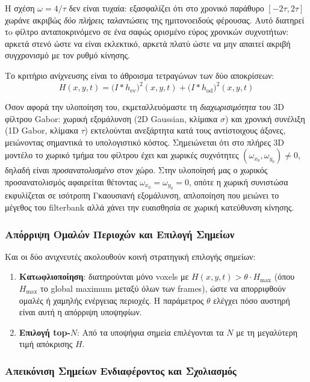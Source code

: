 \documentclass[12pt, a4paper]{article}
\begin{document}
Η σχέση $\omega = 4/\tau$ δεν είναι τυχαία: εξασφαλίζει ότι στο χρονικό παράθυρο
$[-2\tau, 2\tau]$ χωράνε ακριβώς \emph{δύο πλήρεις ταλαντώσεις} της ημιτονοειδούς
φέρουσας. Αυτό διατηρεί τo φίλτρο ανταποκρινόμενο σε ένα σαφώς ορισμένο εύρος
χρονικών συχνοτήτων: αρκετά στενό ώστε να είναι εκλεκτικό, αρκετά πλατύ ώστε
να μην απαιτεί ακριβή συγχρονισμό με τον ρυθμό κίνησης.

Το κριτήριο ανίχνευσης είναι το άθροισμα τετραγώνων των δύο αποκρίσεων:
\begin{equation}
    H(x,y,t) =
    \bigl(I \ast h_{\text{ev}}\bigr)^2(x,y,t) +
    \bigl(I \ast h_{\text{od}}\bigr)^2(x,y,t)
\end{equation}

Όσον αφορά την υλοποίηση του, εκμεταλλευόμαστε τη \emph{διαχωρισιμότητα} του 3D φίλτρου
Gabor: χωρική εξομάλυνση (2D Gaussian, κλίμακα $\sigma$) και χρονική συνέλιξη
(1D Gabor, κλίμακα $\tau$) εκτελούνται ανεξάρτητα κατά τους αντίστοιχους άξονες,
μειώνοντας σημαντικά το υπολογιστικό κόστος. Σημειώνεται ότι στο πλήρες 3D μοντέλο το χωρικό τμήμα του φίλτρου έχει και χωρικές συχνότητες
$(\omega_{x_0}, \omega_{y_0}) \neq 0$, δηλαδή είναι \emph{προσανατολισμένο} στον
χώρο. Στην υλοποίησή μας ο χωρικός προσανατολισμός αφαιρείται θέτοντας
$\omega_{x_0}\!=\!\omega_{y_0}\!=\!0$, οπότε η χωρική συνιστώσα εκφυλίζεται σε
ισότροπη Γκαουσιανή εξομάλυνση, απλοποίηση που μειώνει το μέγεθος του filterbank αλλά χάνει την ευαισθησία σε χωρική κατεύθυνση κίνησης.

\subsubsection{Απόρριψη Ομαλών Περιοχών και Επιλογή Σημείων}

Και οι δύο ανιχνευτές ακολουθούν κοινή στρατηγική επιλογής σημείων:
\begin{enumerate}
    \item \textbf{Κατωφλιοποίηση}: διατηρούνται μόνο voxels με
          $H(x,y,t) > \theta \cdot H_{\max}$ (όπου $H_{\max}$ το global maximum μεταξύ όλων των frames), ώστε να απορριφθούν ομαλές
          ή χαμηλής ενέργειας περιοχές. Η παράμετρος $\theta$ ελέγχει
          πόσο αυστηρή είναι αυτή η απόρριψη υποψηφίων.
    \item \textbf{Επιλογή top-$N$}: Από τα υποψήφια σημεία επιλέγονται
          τα $N$ με τη μεγαλύτερη τιμή απόκρισης $H$.
\end{enumerate}

\subsubsection{Απεικόνιση Σημείων Ενδιαφέροντος και Σχολιασμός}
\end{document}
